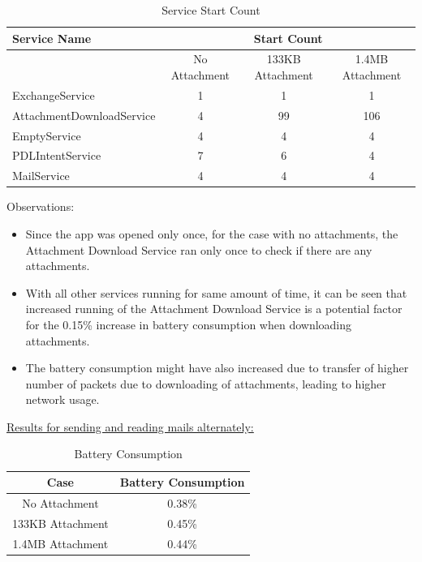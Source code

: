 \begin{table}[!h]
\centering
\caption{Service Start Count}
\label{my-label}
\begin{tabular}{|l|c|c|c|}
\hline
Service Name              & \multicolumn{3}{c|}{Start Count}                    \\ \hline
                          & No Attachment & 133KB Attachment & 1.4MB Attachment \\ \hline
ExchangeService           & 1             & 1                & 1                \\ \hline
AttachmentDownloadService & 4             & 99               & 106              \\ \hline
EmptyService              & 4             & 4                & 4                \\ \hline
PDLIntentService          & 7             & 6                & 4                \\ \hline
MailService               & 4             & 4                & 4                \\ \hline
\end{tabular}
\end{table}
\pagebreak
Observations: 
\begin{itemize}
	\item Since the app was opened only once, for the case with no attachments, the Attachment Download Service ran only once to check if there are any attachments. 
	\item With all other services running for same amount of time, it can be seen that increased running of the Attachment Download Service is a potential factor for the 0.15\% increase in battery consumption when downloading attachments. 
	\item The battery consumption might have also increased due to transfer of higher number of packets due to downloading of attachments, leading to higher network usage.
\end{itemize}
\underline{Results for sending and reading mails alternately: }\\
\begin{table}[!h]
\centering
\caption{Battery Consumption}
\begin{tabular}{|c|c|}
\hline
Case & Battery Consumption\\ \hline
No Attachment & 0.38\%\\ \hline
133KB Attachment & 0.45\% \\ \hline
1.4MB Attachment & 0.44\% \\ \hline 
\end{tabular}
\end{table}
